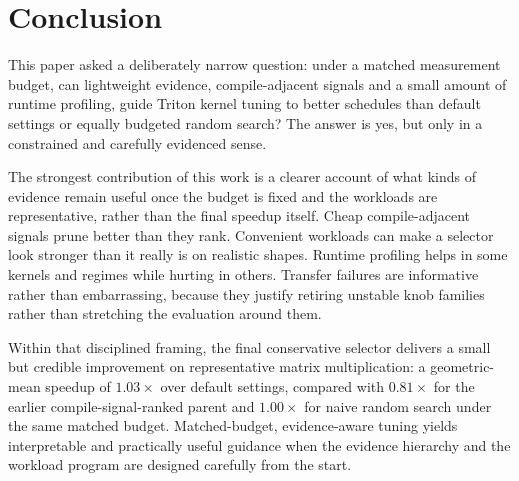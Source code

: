 \section{Conclusion}

This paper asked a deliberately narrow question: under a matched measurement budget, can lightweight evidence, compile-adjacent signals and a small amount of runtime profiling, guide Triton kernel tuning to better schedules than default settings or equally budgeted random search? The answer is yes, but only in a constrained and carefully evidenced sense.

The strongest contribution of this work is a clearer account of what kinds of evidence remain useful once the budget is fixed and the workloads are representative, rather than the final speedup itself. Cheap compile-adjacent signals prune better than they rank. Convenient workloads can make a selector look stronger than it really is on realistic shapes. Runtime profiling helps in some kernels and regimes while hurting in others. Transfer failures are informative rather than embarrassing, because they justify retiring unstable knob families rather than stretching the evaluation around them.

Within that disciplined framing, the final conservative selector delivers a small but credible improvement on representative matrix multiplication: a geometric-mean speedup of $1.03\times$ over default settings, compared with $0.81\times$ for the earlier compile-signal-ranked parent and $1.00\times$ for naive random search under the same matched budget. Matched-budget, evidence-aware tuning yields interpretable and practically useful guidance when the evidence hierarchy and the workload program are designed carefully from the start.
